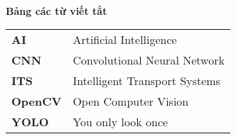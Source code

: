 \textbf{}\\\\\\

\begin{center}
	\LARGE \textbf{Bảng các từ viết tắt}
\end{center}

\large
\renewcommand{\arraystretch}{1.8}
\begin{tabular}{p{70mm}p{90mm}}
	\textbf{AI} & Artificial Intelligence \\
	\textbf{CNN} & Convolutional Neural Network \\
	\textbf{ITS} & Intelligent Transport Systems \\
	\textbf{OpenCV} & Open Computer Vision \\
	\textbf{YOLO} & You only look once \\
\end{tabular}
